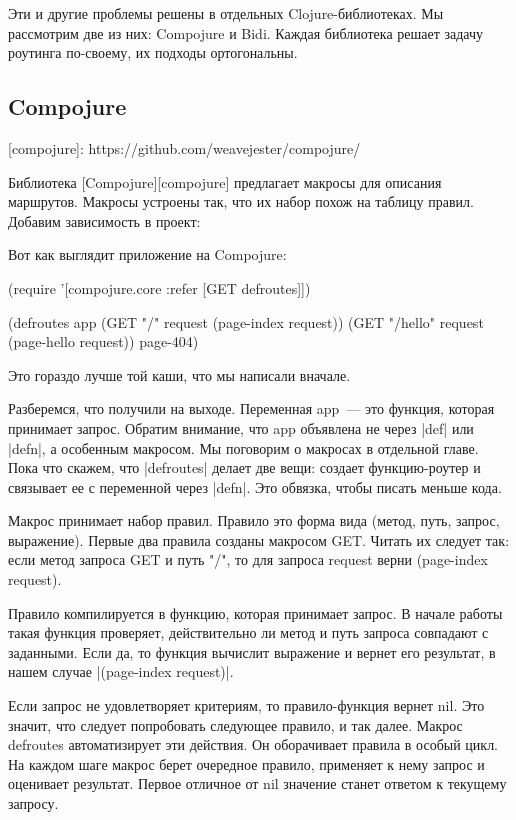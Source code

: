 Эти и другие проблемы решены в отдельных Clojure-библиотеках. Мы рассмотрим две
из них: Compojure и Bidi. Каждая библиотека решает задачу роутинга по-своему, их
подходы ортогональны.

\subsection{Compojure}

[compojure]: https://github.com/weavejester/compojure/

Библиотека [Compojure][compojure] предлагает макросы для описания
маршрутов. Макросы устроены так, что их набор похож на таблицу правил. Добавим
зависимость в проект:

\begin{code}
[compojure "1.6.1"]
\end{code}

Вот как выглядит приложение на Compojure:

\begin{code}
(require '[compojure.core
           :refer [GET defroutes]])

(defroutes app
  (GET "/"      request (page-index request))
  (GET "/hello" request (page-hello request))
  page-404)
\end{code}

Это гораздо лучше той каши, что мы написали вначале.

Разберемся, что получили на выходе. Переменная app~--- это функция, которая
принимает запрос. Обратим внимание, что app объявлена не через \spverb|def| или \spverb|defn|,
а особенным макросом. Мы поговорим о макросах в отдельной главе. Пока что
скажем, что \spverb|defroutes| делает две вещи: создает функцию-роутер и связывает ее с
переменной через \spverb|defn|. Это обвязка, чтобы писать меньше кода.

Макрос принимает набор правил. Правило это форма вида (метод, путь, запрос,
выражение). Первые два правила созданы макросом GET. Читать их следует так: если
метод запроса GET и путь "/", то для запроса request верни (page-index request).

Правило компилируется в функцию, которая принимает запрос. В начале работы такая
функция проверяет, действительно ли метод и путь запроса совпадают с
заданными. Если да, то функция вычислит выражение и вернет его результат, в
нашем случае \spverb|(page-index request)|.

Если запрос не удовлетворяет критериям, то правило-функция вернет nil. Это
значит, что следует попробовать следующее правило, и так далее. Макрос defroutes
автоматизирует эти действия. Он оборачивает правила в особый цикл. На каждом
шаге макрос берет очередное правило, применяет к нему запрос и оценивает
результат. Первое отличное от nil значение станет ответом к текущему запросу.

